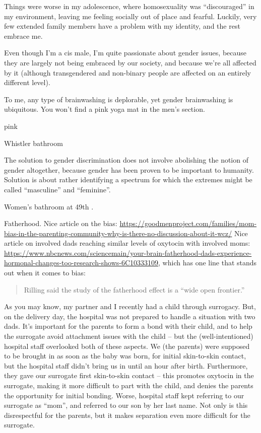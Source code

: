 \documentclass[]{book}
\begin{document}
Things were worse in my adolescence, where homosexuality was ``discouraged'' in my environment, leaving me feeling socially out of place and fearful. Luckily, very few extended family members have a problem with my identity, and the rest embrace me.

Even though I'm a cis male, I'm quite passionate about gender issues, because they are largely not being embraced by our society, and because we're all affected by it (although transgendered and non-binary people are affected on an entirely different level).

To me, any type of brainwashing is deplorable, yet gender brainwashing is ubiquitous. You won't find a pink yoga mat in the men's section.

pink

Whistler bathroom

The solution to gender discrimination does not involve abolishing the notion of gender altogether, because gender has been proven to be important to humanity. Solution is about rather identifying a spectrum for which the extremes might be called ``masculine'' and ``feminine''.

Women's bathroom at 49th \textbar\textbar.

Fatherhood. Nice article on the bias: \url{https://goodmenproject.com/families/mom-bias-in-the-parenting-community-why-is-there-no-discussion-about-it-wcz/}
Nice article on involved dads reaching similar levels of oxytocin with involved moms: \url{https://www.nbcnews.com/sciencemain/your-brain-fatherhood-dads-experience-hormonal-changes-too-research-shows-6C10333109}, which has one line that stands out when it comes to bias:

\begin{quote}
Rilling said the study of the fatherhood effect is a ``wide open frontier.''
\end{quote}

As you may know, my partner and I recently had a child through surrogacy. But, on the delivery day, the hospital was not prepared to handle a situation with two dads. It's important for the parents to form a bond with their child, and to help the surrogate avoid attachment issues with the child -- but the (well-intentioned) hospital staff overlooked both of these aspects. We (the parents) were supposed to be brought in as soon as the baby was born, for initial skin-to-skin contact, but the hospital staff didn't bring us in until an hour after birth. Furthermore, they gave our surrogate first skin-to-skin contact -- this promotes oxytocin in the surrogate, making it more difficult to part with the child, and denies the parents the opportunity for initial bonding. Worse, hospital staff kept referring to our surrogate as ``mom'', and referred to our son by her last name. Not only is this disrespectful for the parents, but it makes separation even more difficult for the surrogate.
\end{document}
